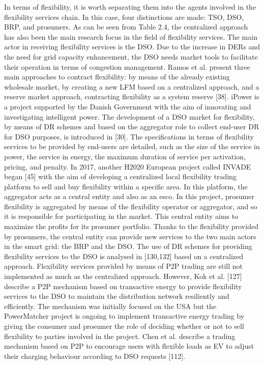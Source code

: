 In terms of flexibility, it is worth separating them into the agents involved in the flexibility services chain. In this case, four distinctions are made: TSO, DSO, BRP, and prosumers. As can be seen from Table 2.4, the centralized approach has also been the main research focus in the field of flexibility services. 
The main actor in receiving flexibility services is the DSO. Due to the increase in DERs and the need for grid capacity enhancement, the DSO needs market tools to facilitate their operation in terms of congestion management. Ramos et al. present three main approaches to contract flexibility: by means of the already existing wholesale market, by creating a new LFM based on a centralized approach, and a reserve market approach, contracting flexibility as a system reserve [38]. iPower is a project supported by the Danish Government with the aim of innovating and investigating intelligent power. The development of a DSO market for flexibility, by means of DR schemes and based on the aggregator role to collect end-user DR for DSO purposes, is introduced in [30]. The specifications in terms of flexibility services to be provided by end-users are detailed, such as the size of the service in power, the service in energy, the maximum duration of service per activation, pricing, and penalty. In 2017, another H2020 European project called INVADE began [45] with the aim of developing a centralized local flexibility trading platform to sell and buy flexibility within a specific area.
In this platform, the aggregator acts as a central entity and also as an esco. In this project, prosumer flexibility is aggregated by means of the flexibility operator or aggregator, and so it is responsible for participating in the market. This central entity aims to maximize the profits for its prosumer portfolio. Thanks to the flexibility provided by prosumers, the central entity can provide new services to the two main actors in the smart grid: the BRP and the DSO. The use of DR schemes for providing flexibility services to the DSO is analysed in [130,132] based on a centralized approach.
Flexibility services provided by means of P2P trading are still not implemented as much as the centralized approach. However, Kok et al. [127] describe a P2P mechanism based on transactive energy to provide flexibility services to the DSO to maintain the distribution network resiliently and efficiently. The mechanism was initially focused on the USA but the PowerMatcher project is ongoing to implement transactive energy trading by giving the consumer and prosumer the role of deciding whether or not to sell flexibility to parties involved in the project. Chen et al. describe a trading mechanism based on P2P to encourage users with flexible loads as EV to adjust their charging behaviour according to DSO requests [112].

